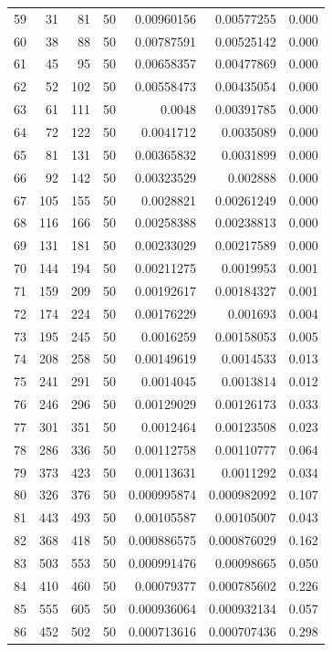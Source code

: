 \begin{tabular}{r r r r r r r}
59 & 31 & 81 & 50 & 0.00960156 & 0.00577255 & 0.000 \\
60 & 38 & 88 & 50 & 0.00787591 & 0.00525142 & 0.000 \\
61 & 45 & 95 & 50 & 0.00658357 & 0.00477869 & 0.000 \\
62 & 52 & 102 & 50 & 0.00558473 & 0.00435054 & 0.000 \\
63 & 61 & 111 & 50 & 0.0048 & 0.00391785 & 0.000 \\
64 & 72 & 122 & 50 & 0.0041712 & 0.0035089 & 0.000 \\
65 & 81 & 131 & 50 & 0.00365832 & 0.0031899 & 0.000 \\
66 & 92 & 142 & 50 & 0.00323529 & 0.002888 & 0.000 \\
67 & 105 & 155 & 50 & 0.0028821 & 0.00261249 & 0.000 \\
68 & 116 & 166 & 50 & 0.00258388 & 0.00238813 & 0.000 \\
69 & 131 & 181 & 50 & 0.00233029 & 0.00217589 & 0.000 \\
70 & 144 & 194 & 50 & 0.00211275 & 0.0019953 & 0.001 \\
71 & 159 & 209 & 50 & 0.00192617 & 0.00184327 & 0.001 \\
72 & 174 & 224 & 50 & 0.00176229 & 0.001693 & 0.004 \\
73 & 195 & 245 & 50 & 0.0016259 & 0.00158053 & 0.005 \\
74 & 208 & 258 & 50 & 0.00149619 & 0.0014533 & 0.013 \\
75 & 241 & 291 & 50 & 0.0014045 & 0.0013814 & 0.012 \\
76 & 246 & 296 & 50 & 0.00129029 & 0.00126173 & 0.033 \\
77 & 301 & 351 & 50 & 0.0012464 & 0.00123508 & 0.023 \\
78 & 286 & 336 & 50 & 0.00112758 & 0.00110777 & 0.064 \\
79 & 373 & 423 & 50 & 0.00113631 & 0.0011292 & 0.034 \\
80 & 326 & 376 & 50 & 0.000995874 & 0.000982092 & 0.107 \\
81 & 443 & 493 & 50 & 0.00105587 & 0.00105007 & 0.043 \\
82 & 368 & 418 & 50 & 0.000886575 & 0.000876029 & 0.162 \\
83 & 503 & 553 & 50 & 0.000991476 & 0.00098665 & 0.050 \\
84 & 410 & 460 & 50 & 0.00079377 & 0.000785602 & 0.226 \\
85 & 555 & 605 & 50 & 0.000936064 & 0.000932134 & 0.057 \\
86 & 452 & 502 & 50 & 0.000713616 & 0.000707436 & 0.298 \\

\end{tabular}
